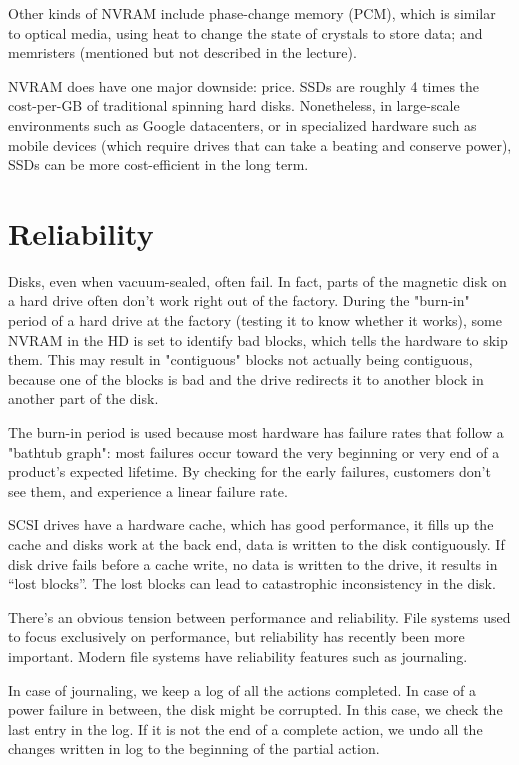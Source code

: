 \documentclass[twoside]{article}
\begin{document}
Other kinds of NVRAM include phase-change memory (PCM), which is similar to optical media, using heat to change the state of crystals to store data; and memristers (mentioned but not described in the lecture).

NVRAM does have one major downside: price. SSDs are roughly 4 times the cost-per-GB of traditional spinning hard disks. Nonetheless, in large-scale environments such as Google datacenters, or in specialized hardware such as mobile devices (which require drives that can take a beating and conserve power), SSDs can be more cost-efficient in the long term.

\section{Reliability}

Disks, even when vacuum-sealed, often fail. In fact, parts of the magnetic disk on a hard drive often don't work right out of the factory. During the "burn-in" period of a hard drive at the factory (testing it to know whether it works), some NVRAM in the HD is set to identify bad blocks, which tells the hardware to skip them. This may result in "contiguous" blocks not actually being contiguous, because one of the blocks is bad and the drive redirects it to another block in another part of the disk.

The burn-in period is used because most hardware has failure rates that follow a "bathtub graph": most failures occur toward the very beginning or very end of a product's expected lifetime. By checking for the early failures, customers don't see them, and experience a linear failure rate.

SCSI drives have a hardware cache, which has good performance, it fills up the cache and disks work at the back end, data is written to the disk contiguously.  If disk drive fails before a cache write, no data is written to the drive, it results in “lost blocks”. The lost blocks can lead to catastrophic inconsistency in the disk.

There's an obvious tension between performance and reliability. File systems used to focus exclusively on performance, but reliability has recently been more important. Modern file systems have reliability features such as journaling.

In case of journaling, we keep a log of all the actions completed. In case of a power failure in between, the disk might be corrupted. In this case, we check the last entry in the log. If it is not the end of a complete action, we undo all the changes written in log to the beginning of the partial action.
\end{document}
